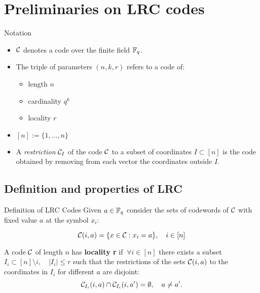 \section{Preliminaries on LRC codes}

\begin{frame}{Notation}
    \begin{itemize}

	    \item $\mathcal{C}$ denotes a code over the finite field $\mathbb{F}_q$.
	    
	    \item The triple of parameters $(n,k,r)$ refers to a code of:
	    \begin{itemize}
	        \item length $n$
	        \item cardinality $q^k$
	        \item locality $r$
	    \end{itemize}
	    
	    \item $[n] := \{ 1, \dots , n\}$
	    
	    \item A \textit{restriction} $\mathcal{C}_I$ of the code $\mathcal{C}$ to a subset of coordinates $I \subset [n]$ is the code obtained by removing from each vector the coordinates outside $I$.
    \end{itemize}
\end{frame}

\subsection{Definition and properties of LRC}

\begin{frame}{Definition of LRC Codes}
    Given $a \in \mathbb{F}_q$ consider the sets of codewords of $\mathcal{C}$ with fixed value $a$ at the symbol $x_i$:

    $$ \mathcal{C} (i,a) = \{ x \in \mathcal{C} : x_i = a \}, \quad i \in [n] $$
    
    \begin{defn}
        A code $\mathcal{C}$ of length $n$ has \textbf{locality r} if $\ \forall i \in [n ] $ there exists a subset $I_i \subset [n] \setminus i, \quad \vert I_i \vert \leq r$ such that the restrictions of the sets $\mathcal{C} (i,a)$ to the coordinates in $I_i$ for different $a$ are disjoint:
        $$\mathcal{C}_{I_i} (i,a) \cap \mathcal{C}_{I_i} (i,a') = \emptyset, \quad a \neq a'.$$
    \end{defn}    
\end{frame}

